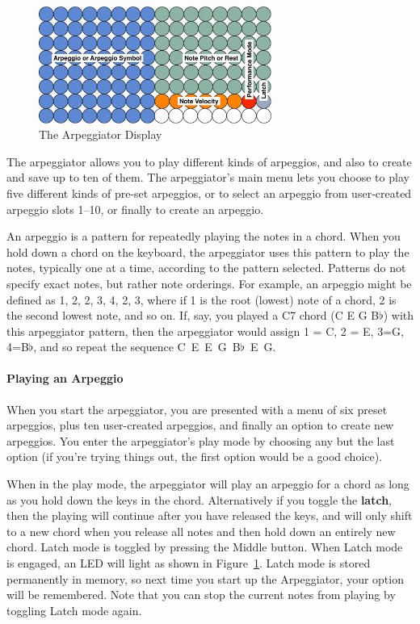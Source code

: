 \documentclass{article}
\begin{document}
\begin{figure}
\vspace{-1.5em}\includegraphics[width=3in]{arpeggio.pdf}
\vspace{-2em}\caption{\small The Arpeggiator Display}\vspace{-1em}
\label{arpeggiator}
\end{figure}

The arpeggiator allows you to play different kinds of arpeggios, and also to create and save up to ten of them.  The arpeggiator's main menu lets you choose to play five different kinds of pre-set arpeggios, or to select an arpeggio from user-created arpeggio slots 1--10, or finally to create an arpeggio.

An arpeggio is a pattern for repeatedly playing the notes in a chord.  When you hold down a chord on the keyboard, the arpeggiator uses this pattern to play the notes, typically one at a time, according to the pattern selected.  Patterns do not specify exact notes, but rather note orderings.  For example, an arpeggio might be defined as 1, 2, 2, 3, 4, 2, 3, where if 1 is the root (lowest) note of a chord, 2 is the second lowest note, and so on.  If, say, you played a C7 chord (C E G B$\flat$) with this arpeggiator pattern, then the arpeggiator would assign 1 = C, 2 = E, 3=G, 4=B$\flat$, and so repeat the sequence \hbox{C E E G B$\flat$ E G.}

\paragraph{Playing an Arpeggio}

When you start the arpeggiator, you are presented with a menu of six preset arpeggios, plus ten user-created arpeggios, and finally an option to create new arpeggios.  You enter the arpeggiator's play mode by choosing any but the last option (if you're trying things out, the first option would be a good choice).

When in the play mode, the arpeggiator will play an arpeggio for a chord as long as you hold down the keys in the chord.  Alternatively if you toggle the {\bf latch}, then the playing will continue after you have released the keys, and will only shift to a new chord when you release all notes and then hold down an entirely new chord.  Latch mode is toggled by pressing the Middle button.  When Latch mode is engaged, an LED will light as shown in Figure~\ref{arpeggiator}.  Latch mode is stored permanently in memory, so next time you start up the Arpeggiator, your option will be remembered.  Note that you can stop the current notes from playing by toggling Latch mode again.
\end{document}
